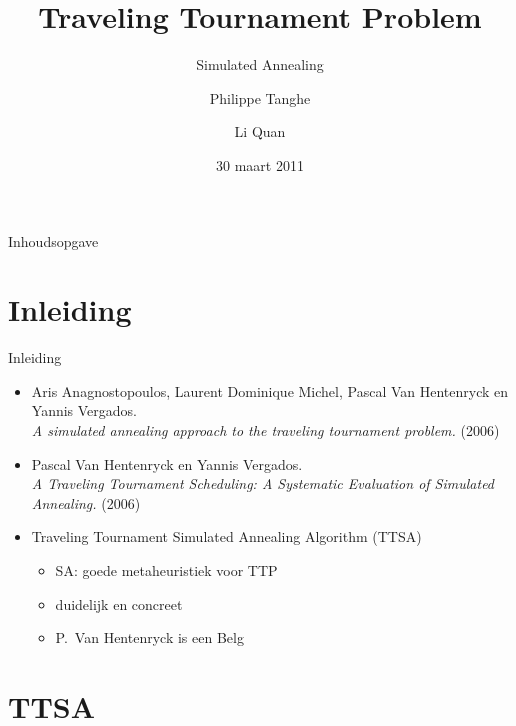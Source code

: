 \documentclass{beamer}
\author{\hspace{-1 cm}Philippe Tanghe\hspace{1 cm}\and Li Quan}
\title{Traveling Tournament Problem}
\date{30 maart 2011}
\subtitle{Simulated Annealing}
\begin{document}
\begin{frame}
\titlepage
\end{frame}

\begin{frame}{Inhoudsopgave}
\tableofcontents%
\end{frame}


\section{Inleiding}
\begin{frame}{Inleiding}
\begin{itemize}
 \item Aris Anagnostopoulos, Laurent Dominique Michel, Pascal Van Hentenryck en Yannis Vergados. \\\emph{A simulated annealing approach to the traveling tournament problem.} (2006)  \pause

\item Pascal Van Hentenryck en Yannis Vergados. \\\emph{A Traveling Tournament Scheduling: A Systematic Evaluation of Simulated Annealing.} (2006)\pause\vspace{1cm}
 
 \item  Traveling Tournament Simulated Annealing Algorithm (TTSA)
\begin{itemize}
 \item SA: goede metaheuristiek voor TTP 
 \item duidelijk en concreet
 \item P.\ Van Hentenryck is een Belg
\end{itemize}
\end{itemize}
\end{frame}



\section{TTSA}
\end{document}
